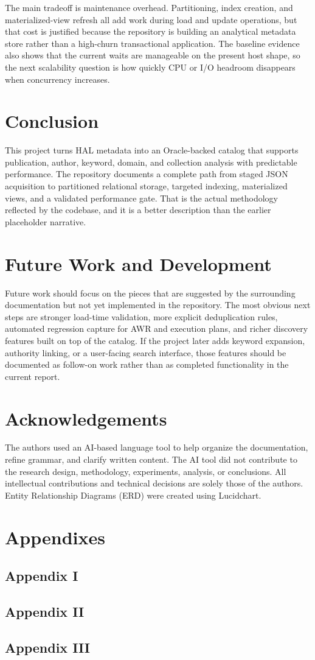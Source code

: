 \documentclass[conference]{IEEEtran}
\begin{document}
The main tradeoff is maintenance overhead. Partitioning, index creation, and materialized-view refresh all add work during load and update operations, but that cost is justified because the repository is building an analytical metadata store rather than a high-churn transactional application. The baseline evidence also shows that the current waits are manageable on the present host shape, so the next scalability question is how quickly CPU or I/O headroom disappears when concurrency increases.
\section{Conclusion}
This project turns HAL metadata into an Oracle-backed catalog that supports publication, author, keyword, domain, and collection analysis with predictable performance. The repository documents a complete path from staged JSON acquisition to partitioned relational storage, targeted indexing, materialized views, and a validated performance gate. That is the actual methodology reflected by the codebase, and it is a better description than the earlier placeholder narrative.

\section{Future Work and Development}
Future work should focus on the pieces that are suggested by the surrounding documentation but not yet implemented in the repository. The most obvious next steps are stronger load-time validation, more explicit deduplication rules, automated regression capture for AWR and execution plans, and richer discovery features built on top of the catalog. If the project later adds keyword expansion, authority linking, or a user-facing search interface, those features should be documented as follow-on work rather than as completed functionality in the current report.

\section*{Acknowledgements}


The authors used an AI-based language tool to help organize the documentation, refine grammar, and clarify written content. The AI tool did not contribute to the research design, methodology, experiments, analysis, or conclusions. All intellectual contributions and technical decisions are solely those of the authors. Entity Relationship Diagrams (ERD) were created using Lucidchart.

\section*{Appendixes}
\subsection*{Appendix I}
\subsection*{Appendix II}
\subsection*{Appendix III}



%
\balance
%
\end{document}
